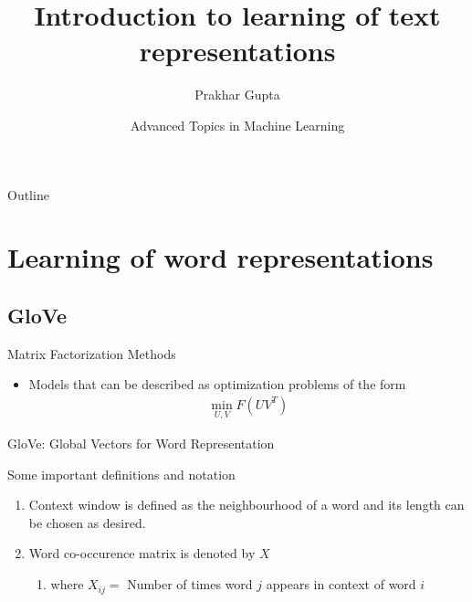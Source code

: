 \documentclass{beamer}
\title[Text Representations]{Introduction to learning of text representations}
\author{Prakhar Gupta}
\institute[EPFL] %
{
  
  Department of Computer and Communication Sciences\\
  EPFL
}
\date[Advanced topics in ML]{Advanced Topics in Machine Learning}
\begin{document}
\begin{frame}
  \titlepage
\end{frame}

\begin{frame}{Outline}
  \tableofcontents
\end{frame}

\section{Learning of word representations}

\subsection{GloVe}

\begin{frame}{Matrix Factorization Methods}
  \begin{itemize}
   \item<2-> Models that can be described as optimization problems of the form
    \begin{align}
    \min_{U,V} F(UV^T)
    \end{align}
  \end{itemize}
\end{frame}

\begin{frame}{GloVe: Global Vectors for Word Representation}
  \begin{block}{Some important definitions and notation}
  \begin{enumerate} 
     \item<2-> Context window is defined as the neighbourhood of a word and its length can be chosen 
     as desired.
     \item<3-> Word co-occurence matrix is denoted by $X$
      \begin{enumerate}
       \item<4-> where $X_{ij} =$ Number of times word $j$ appears in context of word $i$
      \end{enumerate}
    \end{enumerate}
  \end{block}
\end{frame}
\end{document}
